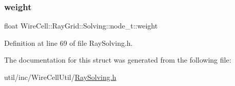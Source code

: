 \subsubsection{\texorpdfstring{weight}{weight}}
{\footnotesize\ttfamily float Wire\+Cell\+::\+Ray\+Grid\+::\+Solving\+::node\+\_\+t\+::weight}



Definition at line 69 of file Ray\+Solving.\+h.



The documentation for this struct was generated from the following file\+:\begin{DoxyCompactItemize}
\item 
util/inc/\+Wire\+Cell\+Util/\hyperlink{_ray_solving_8h}{Ray\+Solving.\+h}\end{DoxyCompactItemize}
